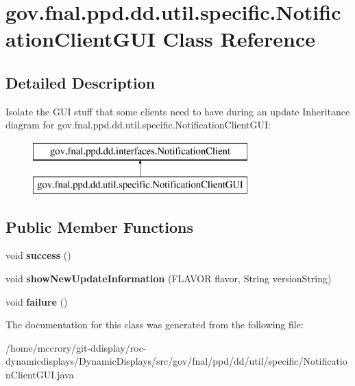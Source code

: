 \hypertarget{classgov_1_1fnal_1_1ppd_1_1dd_1_1util_1_1specific_1_1NotificationClientGUI}{\section{gov.\-fnal.\-ppd.\-dd.\-util.\-specific.\-Notification\-Client\-G\-U\-I Class Reference}
\label{classgov_1_1fnal_1_1ppd_1_1dd_1_1util_1_1specific_1_1NotificationClientGUI}
}


\subsection{Detailed Description}
Isolate the G\-U\-I stuff that some clients need to have during an update Inheritance diagram for gov.\-fnal.\-ppd.\-dd.\-util.\-specific.\-Notification\-Client\-G\-U\-I\-:\begin{figure}[H]
\begin{center}
\leavevmode
\includegraphics[height=2.000000cm]{classgov_1_1fnal_1_1ppd_1_1dd_1_1util_1_1specific_1_1NotificationClientGUI}
\end{center}
\end{figure}
\subsection*{Public Member Functions}
\begin{DoxyCompactItemize}
\item 
\hypertarget{classgov_1_1fnal_1_1ppd_1_1dd_1_1util_1_1specific_1_1NotificationClientGUI_a4b11dc1662b8cd3e6b4816a60adc2000}{void {\bfseries success} ()}\label{classgov_1_1fnal_1_1ppd_1_1dd_1_1util_1_1specific_1_1NotificationClientGUI_a4b11dc1662b8cd3e6b4816a60adc2000}

\item 
\hypertarget{classgov_1_1fnal_1_1ppd_1_1dd_1_1util_1_1specific_1_1NotificationClientGUI_a373fcb7ff3d7811e0113ec46ad361208}{void {\bfseries show\-New\-Update\-Information} (F\-L\-A\-V\-O\-R flavor, String version\-String)}\label{classgov_1_1fnal_1_1ppd_1_1dd_1_1util_1_1specific_1_1NotificationClientGUI_a373fcb7ff3d7811e0113ec46ad361208}

\item 
\hypertarget{classgov_1_1fnal_1_1ppd_1_1dd_1_1util_1_1specific_1_1NotificationClientGUI_a461ff133d0a5f8b53a65c84181a2c631}{void {\bfseries failure} ()}\label{classgov_1_1fnal_1_1ppd_1_1dd_1_1util_1_1specific_1_1NotificationClientGUI_a461ff133d0a5f8b53a65c84181a2c631}

\end{DoxyCompactItemize}


The documentation for this class was generated from the following file\-:\begin{DoxyCompactItemize}
\item 
/home/mccrory/git-\/ddisplay/roc-\/dynamicdisplays/\-Dynamic\-Displays/src/gov/fnal/ppd/dd/util/specific/Notification\-Client\-G\-U\-I.\-java\end{DoxyCompactItemize}

